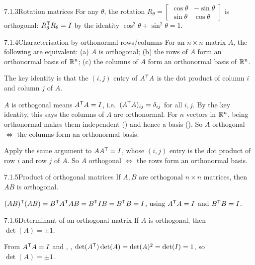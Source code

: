 \begin{exmp}{7.1.3}{Rotation matrices}
For any $\theta$, the rotation $R_\theta=\left[\begin{smallmatrix}\cos\theta&-\sin\theta\\\sin\theta&\cos\theta\end{smallmatrix}\right]$ is orthogonal: $R_\theta^{\mathsf{T}} R_\theta=I$ by the identity $\cos^2\theta+\sin^2\theta=1$.
\end{exmp}

\begin{thms}{7.1.4}{Characterisation by orthonormal rows/columns}
For an $n\times n$ matrix $A$, the following are equivalent:
\textup{(a)} $A$ is orthogonal;
\textup{(b)} the rows of $A$ form an orthonormal basis of $\mathbb{R}^n$;
\textup{(c)} the columns of $A$ form an orthonormal basis of $\mathbb{R}^n$.
\end{thms}

\begin{prf}
The key identity is that the $(i,j)$ entry of $A^{\mathsf{T}} A$ is the dot product of column $i$ and column $j$ of $A$.

 $A$ is orthogonal means $A^{\mathsf{T}} A=I$, i.e.\ $(A^{\mathsf{T}} A)_{ij}=\delta_{ij}$ for all $i,j$. By the key identity, this says the columns of $A$ are orthonormal. For $n$ vectors in $\mathbb{R}^n$, being orthonormal makes them independent () and hence a basis (). So $A$ orthogonal $\iff$ the columns form an orthonormal basis.

 Apply the same argument to $AA^{\mathsf{T}}=I$, whose $(i,j)$ entry is the dot product of row $i$ and row $j$ of $A$. So $A$ orthogonal $\iff$ the rows form an orthonormal basis.
\end{prf}

\begin{lems}{7.1.5}{Product of orthogonal matrices}
If $A,B$ are orthogonal $n\times n$ matrices, then $AB$ is orthogonal.
\end{lems}

\begin{prf}
$(AB)^{\mathsf{T}}(AB)=B^{\mathsf{T}} A^{\mathsf{T}} AB=B^{\mathsf{T}} IB=B^{\mathsf{T}} B=I$, using $A^{\mathsf{T}} A=I$ and $B^{\mathsf{T}} B=I$.
\end{prf}

\begin{lems}{7.1.6}{Determinant of an orthogonal matrix}
If $A$ is orthogonal, then $\det(A)=\pm1$.
\end{lems}

\begin{prf}
From $A^{\mathsf{T}} A=I$ and , , $\det(A^{\mathsf{T}})\det(A)=\det(A)^2=\det(I)=1$, so $\det(A)=\pm1$.
\end{prf}

